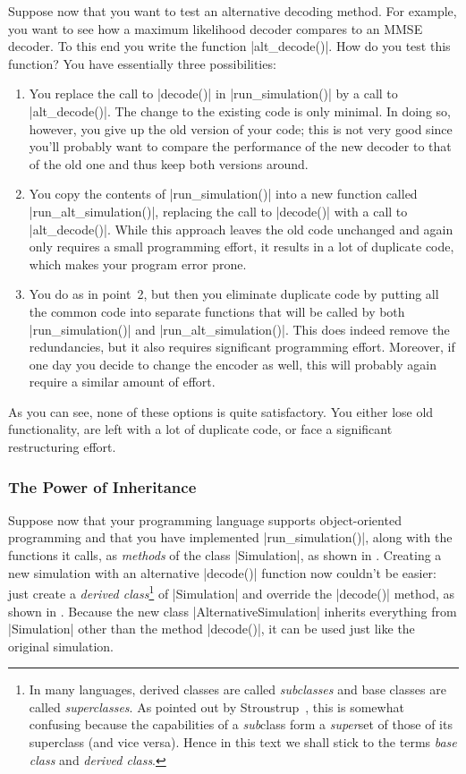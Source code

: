 Suppose now that you want to test an alternative decoding method. For example,
you want to see how a maximum likelihood decoder compares to an MMSE decoder. To
this end you write the function |alt_decode()|. How do you test this function?
You have essentially three possibilities:
\begin{enumerate}
  \item You replace the call to |decode()| in |run_simulation()| by a call to
    |alt_decode()|. The change to the existing code is only minimal. In doing
    so, however, you give up the old version of your code; this is not very
    good since you'll probably want to compare the performance of the new
    decoder to that of the old one and thus keep both versions around.

  \item You copy the contents of |run_simulation()| into a new function called
    |run_alt_simulation()|, replacing the call to |decode()| with a call to
    |alt_decode()|. While
    this approach leaves the old code unchanged and again only requires a small
    programming effort, it results in a lot of duplicate code, which makes your
    program error prone.

  \item You do as in point~2, but then you eliminate duplicate code by putting
    all the common code into separate functions that will be called by both
    |run_simulation()| and |run_alt_simulation()|. This does indeed remove the
    redundancies, but it also requires significant programming effort. Moreover,
    if one day you decide to change the encoder as well, this will probably
    again require a similar amount of effort. 
\end{enumerate}

As you can see, none of these options is quite satisfactory. You either lose old
functionality, are left with a lot of duplicate code, or face a significant
restructuring effort.


\subsubsection{The Power of Inheritance}

Suppose now that your programming language supports object-oriented programming
and that you have implemented |run_simulation()|, along with the functions it
calls, as \emph{methods} of the class |Simulation|, as shown in
. Creating a new simulation with an alternative |decode()|
function now couldn't be easier: just create a \emph{derived class}\footnote{In
many languages, derived classes are called \emph{subclasses} and base classes
are called \emph{superclasses}. As pointed out by
Stroustrup~\cite{Stroustrup1997}, this is somewhat confusing because the
capabilities of a \emph{sub}class form a \emph{super}set of those of its
superclass (and vice versa). Hence in this text we shall stick to the terms
\emph{base class} and \emph{derived class}.} of |Simulation| and override the
|decode()| method, as shown in . Because the new class
|AlternativeSimulation| inherits everything from |Simulation| other than
the method |decode()|, it can be used just like the original simulation.

